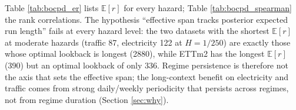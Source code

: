 Table \ref{tab:bocpd_er} lists $\mathbb{E}[r]$ for every hazard; Table \ref{tab:bocpd_spearman} the rank correlations. The hypothesis ``effective span tracks posterior expected run length'' fails at every hazard level: the two datasets with the shortest $\mathbb{E}[r]$ at moderate hazards (traffic 87, electricity 122 at $H{=}1/250$) are exactly those whose optimal lookback is longest (2880), while ETTm2 has the longest $\mathbb{E}[r]$ (390) but an optimal lookback of only 336. Regime persistence is therefore not the axis that sets the effective span; the long-context benefit on electricity and traffic comes from strong daily/weekly periodicity that persists across regimes, not from regime duration (Section \ref{sec:why}).
